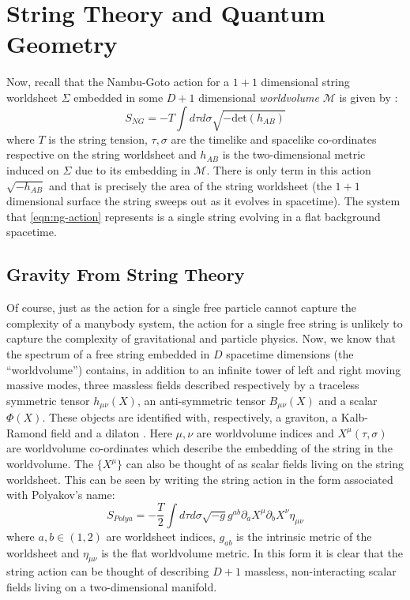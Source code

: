 \documentclass[submission, Phys]{SciPost}
\newcommand{\mc}[1]{\mathcal{#1}}
\begin{document}
\section{String Theory and Quantum Geometry}\label{sec:string-geometry}

Now, recall that the Nambu-Goto action for a $ 1+1 $ dimensional string worldsheet $ \Sigma $ embedded in some $ D+1 $ dimensional \emph{worldvolume} $ \mc{M} $ is given by \cite{t-Hooft2004Introduction,Tong2010Lectures,Zwiebach2009A-First}:
\begin{equation}\label{eqn:ng-action}
	S_{NG} = -T \int d\tau d\sigma \sqrt{-\text{det} (h_{AB})}
\end{equation}
where $ T $ is the string tension, $ \tau, \sigma $ are the timelike and spacelike co-ordinates respective on the string worldsheet and $ h_{AB} $ is the two-dimensional metric induced on $ \Sigma $ due to its embedding in $ \mc{M} $. There is only term in this action $ \sqrt{-h_{AB}} $ and that is precisely the area of the string worldsheet (the $ 1+1 $ dimensional surface the string sweeps out as it evolves in spacetime). The system that \eqref{eqn:ng-action} represents is a single string evolving in a flat background spacetime.

\subsection{Gravity From String Theory}

Of course, just as the action for a single free particle cannot capture the complexity of a manybody system, the action for a single free string is unlikely to capture the complexity of gravitational and particle physics. Now, we know that the spectrum of a free string embedded in $ D $ spacetime dimensions (the ``worldvolume'') contains, in addition to an infinite tower of left and right moving massive modes, three massless fields described respectively by a traceless symmetric tensor $ h_{\mu\nu}(X) $, an anti-symmetric tensor $ B_{\mu\nu}(X) $ and a scalar $ \Phi(X) $. These objects are identified with, respectively, a graviton, a Kalb-Ramond field and a dilaton \cite[Sec 2.3.2]{Tong2010Lectures}. Here $ \mu, \nu $ are worldvolume indices and $ X^{\mu}(\tau,\sigma) $ are worldvolume co-ordinates which describe the embedding of the string in the worldvolume. The $ \{X^\mu\} $ can also be thought of as scalar fields living on the string worldsheet. This can be seen by writing the string action in the form associated with Polyakov's name:
\begin{equation}\label{eqn:polyakov-flat}
	S_{Polya} = -\frac{T}{2} \int d\tau d\sigma \sqrt{-g} g^{ab} \partial_a X^\mu \partial_b X^\nu \eta_{\mu\nu}
\end{equation}
where $ a,b \in (1,2) $ are worldsheet indices, $ g_{ab} $ is the intrinsic metric of the worldsheet and $ \eta_{\mu\nu} $ is the flat worldvolume metric. In this form it is clear that the string action can be thought of describing $ D+1 $ massless, non-interacting scalar fields living on a two-dimensional manifold.
\end{document}
